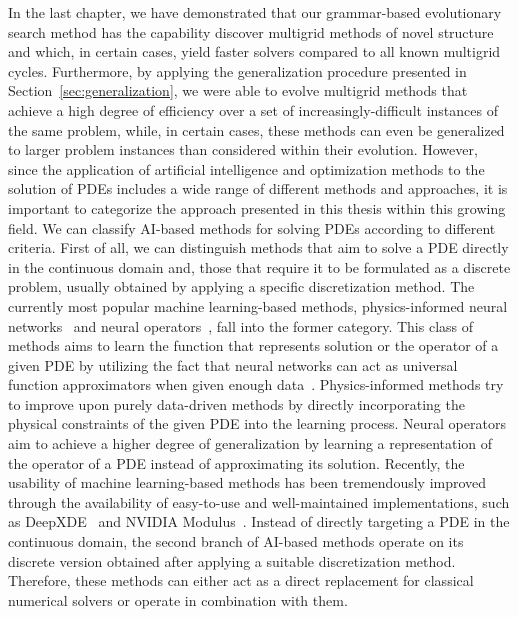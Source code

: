 In the last chapter, we have demonstrated that our grammar-based evolutionary search method has the capability discover multigrid methods of novel structure and which, in certain cases, yield faster solvers compared to all known multigrid cycles.
Furthermore, by applying the generalization procedure presented in  Section~\ref{sec:generalization}, we were able to evolve multigrid methods that achieve a high degree of efficiency over a set of increasingly-difficult instances of the same problem, while, in certain cases, these methods can even be generalized to larger problem instances than considered within their evolution.
However, since the application of artificial intelligence and optimization methods to the solution of PDEs includes a wide range of different methods and approaches, it is important to categorize the approach presented in this thesis within this growing field.
We can classify AI-based methods for solving PDEs according to different criteria.
First of all, we can distinguish methods that aim to solve a PDE directly in the continuous domain and, those that require it to be formulated as a discrete problem, usually obtained by applying a specific discretization method.
The currently most popular machine  learning-based methods, physics-informed neural networks~\cite{karniadakis2021physics,raissi2019physics,kharazmi2019variational,kharazmi2021hp} and neural operators~\cite{li2020fourier,guibas2021efficient,lu2021learning,li2021physics}, fall into the former category.
This class of methods aims to learn the function that represents solution or the operator of a given PDE by utilizing the fact that neural networks can act as universal function approximators when given enough data~\cite{hornik1989multilayer}.
Physics-informed methods try to improve upon purely data-driven methods by directly incorporating the physical constraints of the given PDE into the learning process.
Neural operators aim to achieve a higher degree of generalization by learning a representation of the operator of a PDE instead of approximating its solution.
Recently, the usability of machine learning-based methods has been tremendously improved through the availability of easy-to-use and well-maintained implementations, such as DeepXDE~\cite{lu2021deepxde} and NVIDIA Modulus~\cite{hennigh2021nvidia}. 
Instead of directly targeting a PDE in the continuous domain, the second branch of AI-based methods operate on its discrete version obtained after applying a suitable discretization method.
Therefore, these methods can either act as a direct replacement for classical numerical solvers or operate in combination with them.
